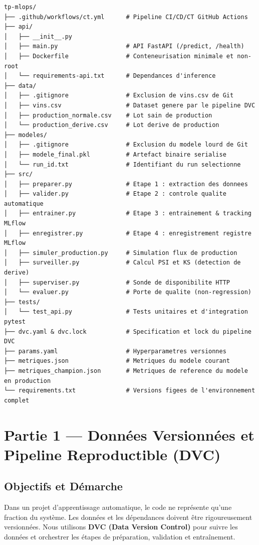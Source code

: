 \documentclass[12pt,a4paper]{article}
\begin{document}
\begin{lstlisting}[style=simplebash]
tp-mlops/
├── .github/workflows/ct.yml      # Pipeline CI/CD/CT GitHub Actions
├── api/
│   ├── __init__.py
│   ├── main.py                   # API FastAPI (/predict, /health)
│   ├── Dockerfile                # Conteneurisation minimale et non-root
│   └── requirements-api.txt      # Dependances d'inference
├── data/
│   ├── .gitignore                # Exclusion de vins.csv de Git
│   ├── vins.csv                  # Dataset genere par le pipeline DVC
│   ├── production_normale.csv    # Lot sain de production
│   └── production_derive.csv     # Lot derive de production
├── modeles/
│   ├── .gitignore                # Exclusion du modele lourd de Git
│   ├── modele_final.pkl          # Artefact binaire serialise
│   └── run_id.txt                # Identifiant du run selectionne
├── src/
│   ├── preparer.py               # Etape 1 : extraction des donnees
│   ├── valider.py                # Etape 2 : controle qualite automatique
│   ├── entrainer.py              # Etape 3 : entrainement & tracking MLflow
│   ├── enregistrer.py            # Etape 4 : enregistrement registre MLflow
│   ├── simuler_production.py     # Simulation flux de production
│   ├── surveiller.py             # Calcul PSI et KS (detection de derive)
│   ├── superviser.py             # Sonde de disponibilite HTTP
│   └── evaluer.py                # Porte de qualite (non-regression)
├── tests/
│   └── test_api.py               # Tests unitaires et d'integration pytest
├── dvc.yaml & dvc.lock           # Specification et lock du pipeline DVC
├── params.yaml                   # Hyperparametres versionnes
├── metriques.json                # Metriques du modele courant
├── metriques_champion.json       # Metriques de reference du modele en production
└── requirements.txt              # Versions figees de l'environnement complet
\end{lstlisting}

\newpage

\section{Partie 1 — Données Versionnées et Pipeline Reproductible (DVC)}

\subsection{Objectifs et Démarche}
Dans un projet d'apprentissage automatique, le code ne représente qu'une fraction du système. Les données et les dépendances doivent être rigoureusement versionnées. Nous utilisons \textbf{DVC (Data Version Control)} pour suivre les données et orchestrer les étapes de préparation, validation et entraînement.
\end{document}
